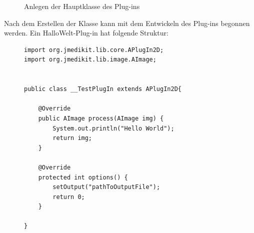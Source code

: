 \begin{figure}[H]
  \vspace{0.5cm}
  \centering
  \caption{Anlegen der Hauptklasse des Plug-ins}
  \label{class}
  \vspace{0.5cm}
\end{figure}

Nach dem Erstellen der Klasse kann mit dem Entwickeln des Plug-ins begonnen werden. Ein HalloWelt-Plug-in hat folgende Struktur:

\begin{figure}[htbp]
\begin{lstlisting}[frame=leftline]
import org.jmedikit.lib.core.APlugIn2D;
import org.jmedikit.lib.image.AImage;


public class __TestPlugIn extends APlugIn2D{

	@Override
	public AImage process(AImage img) {
		System.out.println("Hello World");
		return img;
	}

	@Override
	protected int options() {
		setOutput("pathToOutputFile");
		return 0;
	}

}
\end{lstlisting}

\end{figure}